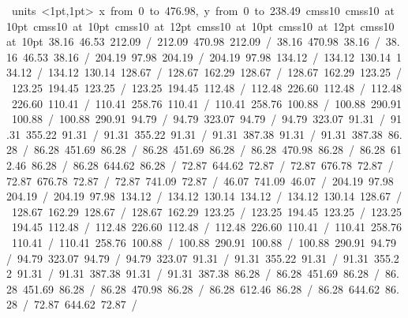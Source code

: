 \hbox{\beginpicture
\setcoordinatesystem units <1pt,1pt>
\setplotarea x from 0 to 476.98, y from 0 to 238.49
\setlinear
\font\picfont cmss10\picfont
\font\picfont cmss10 at 10pt\picfont
\font\picfont cmss10 at 10pt\picfont
\font\picfont cmss10 at 12pt\picfont
\font\picfont cmss10 at 10pt\picfont
\font\picfont cmss10 at 12pt\picfont
\font\picfont cmss10 at 10pt\picfont
\setsolid
\setsolid
{} 38.16 46.53 212.09 /
 212.09 470.98 212.09 /
 38.16 470.98 38.16 /
 38.16 46.53 38.16 /
\setsolid
{} 204.19 97.98 204.19 /
 204.19 97.98 134.12 /
 134.12 130.14 134.12 /
 134.12 130.14 128.67 /
 128.67 162.29 128.67 /
 128.67 162.29 123.25 /
 123.25 194.45 123.25 /
 123.25 194.45 112.48 /
 112.48 226.60 112.48 /
 112.48 226.60 110.41 /
 110.41 258.76 110.41 /
 110.41 258.76 100.88 /
 100.88 290.91 100.88 /
 100.88 290.91 94.79 /
 94.79 323.07 94.79 /
 94.79 323.07 91.31 /
 91.31 355.22 91.31 /
 91.31 355.22 91.31 /
 91.31 387.38 91.31 /
 91.31 387.38 86.28 /
 86.28 451.69 86.28 /
 86.28 451.69 86.28 /
 86.28 470.98 86.28 /
 86.28 612.46 86.28 /
 86.28 644.62 86.28 /
 72.87 644.62 72.87 /
 72.87 676.78 72.87 /
 72.87 676.78 72.87 /
 72.87 741.09 72.87 /
 46.07 741.09 46.07 /
\setsolid
{} 204.19 97.98 204.19 /
 204.19 97.98 134.12 /
 134.12 130.14 134.12 /
 134.12 130.14 128.67 /
 128.67 162.29 128.67 /
 128.67 162.29 123.25 /
 123.25 194.45 123.25 /
 123.25 194.45 112.48 /
 112.48 226.60 112.48 /
 112.48 226.60 110.41 /
 110.41 258.76 110.41 /
 110.41 258.76 100.88 /
 100.88 290.91 100.88 /
 100.88 290.91 94.79 /
 94.79 323.07 94.79 /
 94.79 323.07 91.31 /
 91.31 355.22 91.31 /
 91.31 355.22 91.31 /
 91.31 387.38 91.31 /
 91.31 387.38 86.28 /
 86.28 451.69 86.28 /
 86.28 451.69 86.28 /
 86.28 470.98 86.28 /
 86.28 612.46 86.28 /
 86.28 644.62 86.28 /
 72.87 644.62 72.87 /
}
